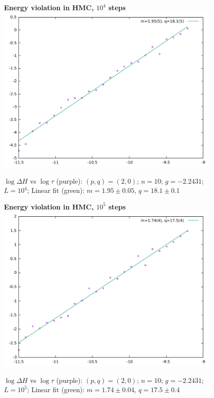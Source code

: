 \documentclass[12pt,a4paper]{article}
\begin{document}
\begin{figure}[!htb]
\centering
\textbf{Energy violation in HMC, $10^4$ steps}
\includegraphics[width=1\linewidth]{quadratic104.pdf}
\caption{$\log \Delta H$ vs $\log \tau$ (purple): $(p,q)=(2,0)$; $n=10$; $g=-2.2431$; $L=10^4$; Linear fit (green): $m=1.95 \pm 0.05$, $q = 18.1 \pm 0.1$}
\end{figure}

\begin{figure}[!htb]
\centering
\textbf{Energy violation in HMC, $10^5$ steps}
\includegraphics[width=1\linewidth]{quadratic105.pdf}
\caption{$\log \Delta H$ vs $\log \tau$ (purple): $(p,q)=(2,0)$; $n=10$; $g=-2.2431$; $L=10^5$; Linear fit (green): $m=1.74 \pm 0.04$, $q = 17.5 \pm 0.4$}
\end{figure}
\end{document}
